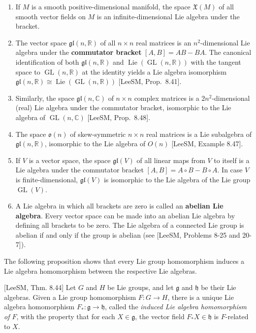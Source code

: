 \begin{example}\label{ex:lie-algebras}
\begin{enumerate}
\item[(a)] If $M$ is a smooth positive-dimensional manifold, the space $\mathfrak{X}(M)$ of all smooth vector fields on $M$ is an infinite-dimensional Lie algebra under the bracket.
\item[(b)] The vector space $\mathfrak{gl}(n, \mathbb{R})$ of all $n \times n$ real matrices is an $n^2$-dimensional Lie algebra under the \textbf{commutator bracket} $[A, B] = AB - BA$. The canonical identification of both $\mathfrak{gl}(n, \mathbb{R})$ and $\operatorname{Lie}(\operatorname{GL}(n, \mathbb{R}))$ with the tangent space to $\operatorname{GL}(n, \mathbb{R})$ at the identity yields a Lie algebra isomorphism $\mathfrak{gl}(n, \mathbb{R}) \cong \operatorname{Lie}(\operatorname{GL}(n, \mathbb{R}))$ [LeeSM, Prop.\ 8.41].
\item[(c)] Similarly, the space $\mathfrak{gl}(n, \mathbb{C})$ of $n \times n$ complex matrices is a $2n^2$-dimensional (real) Lie algebra under the commutator bracket, isomorphic to the Lie algebra of $\operatorname{GL}(n, \mathbb{C})$ [LeeSM, Prop.\ 8.48].
\item[(d)] The space $\mathfrak{o}(n)$ of skew-symmetric $n \times n$ real matrices is a Lie subalgebra of $\mathfrak{gl}(n, \mathbb{R})$, isomorphic to the Lie algebra of $O(n)$ [LeeSM, Example 8.47].
\item[(e)] If $V$ is a vector space, the space $\mathfrak{gl}(V)$ of all linear maps from $V$ to itself is a Lie algebra under the commutator bracket $[A, B] = A \circ B - B \circ A$. In case $V$ is finite-dimensional, $\mathfrak{gl}(V)$ is isomorphic to the Lie algebra of the Lie group $\operatorname{GL}(V)$.
\item[(f)] A Lie algebra in which all brackets are zero is called an \textbf{abelian Lie algebra}. Every vector space can be made into an abelian Lie algebra by defining all brackets to be zero. The Lie algebra of a connected Lie group is abelian if and only if the group is abelian (see [LeeSM, Problems 8-25 and 20-7]).
\end{enumerate}
\end{example}

The following proposition shows that every Lie group homomorphism induces a Lie algebra homomorphism between the respective Lie algebras.

\begin{proposition}\label{prop:induced-lie-algebra-homomorphism}
[LeeSM, Thm. 8.44] Let $G$ and $H$ be Lie groups, and let $\mathfrak{g}$ and $\mathfrak{h}$ be their Lie algebras. Given a Lie group homomorphism $F: G \to H$, there is a unique Lie algebra homomorphism $F_*: \mathfrak{g} \to \mathfrak{h}$, called the \textit{induced Lie algebra homomorphism of $F$}, with the property that for each $X \in \mathfrak{g}$, the vector field $F_* X \in \mathfrak{h}$ is $F$-related to $X$.
\end{proposition}

